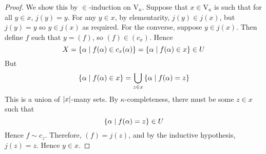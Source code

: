 \begin{proof}
    We show this by \( \in \)-induction on \( \mathrm{V}_\kappa \).
    Suppose that \( x \in \mathrm{V}_\kappa \) is such that for all \( y \in x \), \( j(y) = y \).
    For any \( y \in x \), by elementarity, \( j(y) \in j(x) \), but \( j(y) = y \) so \( y \in j(x) \) as required.
    For the converse, suppose \( y \in j(x) \).
    Then define \( f \) such that \( y = (f) \), so \( (f) \in (c_x) \).
    Hence
    \[ X = \qty{\alpha \mid f(\alpha) \in c_x(\alpha)} = \qty{\alpha \mid f(\alpha) \in x} \in U \]
    But
    \[ \qty{\alpha \mid f(\alpha) \in x} = \bigcup_{z \in x} \qty{\alpha \mid f(\alpha) = z} \]
    This is a union of \( \abs{x} \)-many sets.
    By \( \kappa \)-completeness, there must be some \( z \in x \) such that
    \[ \qty{\alpha \mid f(\alpha) = z} \in U \]
    Hence \( f \sim c_z \).
    Therefore, \( (f) = j(z) \), and by the inductive hypothesis, \( j(z) = z \).
    Hence \( y \in x \).
\end{proof}

